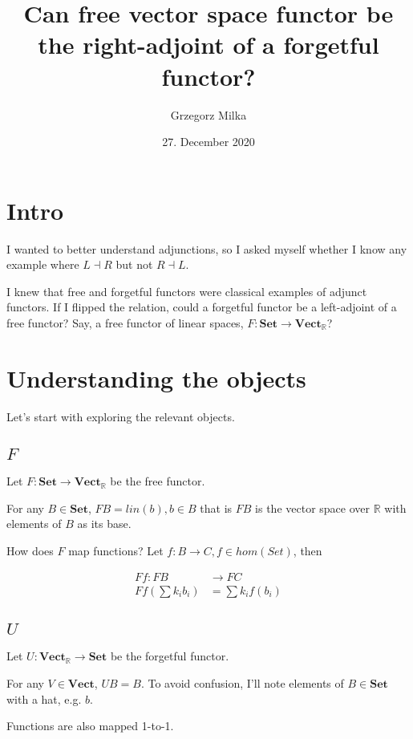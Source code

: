\documentclass[12pt]{article}
\title{Can free vector space functor be the right-adjoint of a forgetful functor?}
\author{Grzegorz Milka}
\date{27. December 2020}
\newcommand{\R}{\mathbb{R}}
\newcommand{\Set}{\mathbf{Set}}
\newcommand{\Vect}{\mathbf{Vect}}
\begin{document}
\maketitle
\tableofcontents

\section{Intro}

I wanted to better understand adjunctions, so I asked myself whether I know any
example where \(L \dashv R\) but not \(R \dashv L\).

I knew that free and forgetful functors
were classical examples of adjunct functors. If I flipped the relation,
could a forgetful functor be a left-adjoint of a free functor? Say, a free
functor of linear spaces, \(F: \Set \rightarrow \Vect_{\R}\)?

\section{Understanding the objects}

Let's start with exploring the relevant objects.

\subsection{$F$}

Let $F: \Set \rightarrow \Vect_{\R}$ be the free functor.

For any $B \in \Set$, $FB = lin(b), b \in B$ that is $FB$ is the vector space over $\R$
with elements of $B$ as its base.

How does $F$ map functions? Let $f: B \rightarrow C, f \in hom(Set)$, then

 \begin{align*}
  Ff: FB &\rightarrow FC\\
  Ff\left(\sum k_ib_i\right) &= \sum k_i f(b_i)
  \end{align*}

\subsection{$U$}

Let $U: \Vect_{\R} \rightarrow \Set$ be the forgetful functor.

For any $V \in \Vect$, $UB = B$. To avoid confusion, I'll note elements of $B
\in \Set$ with a hat, e.g. $\hat{b}$.

Functions are also mapped 1-to-1.
\end{document}

